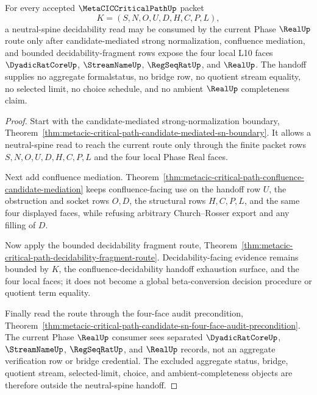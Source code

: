 \begin{theorem}
\label{thm:metacic-critical-path-neutral-spine-decidability-handoff}
For every accepted $\MetaCICCriticalPathUp$ packet
$$
K=(S,N,O,U,D,H,C,P,L),
$$
a neutral-spine decidability read may be consumed by the current Phase $\RealUp$ route only after candidate-mediated strong normalization, confluence mediation, and bounded decidability-fragment rows expose the four local L10 faces $\DyadicRatCoreUp$, $\StreamNameUp$, $\RegSeqRatUp$, and $\RealUp$. The handoff supplies no aggregate formalstatus, no bridge row, no quotient stream equality, no selected limit, no choice schedule, and no ambient $\RealUp$ completeness claim.
\end{theorem}
\begin{proof}
Start with the candidate-mediated strong-normalization boundary, Theorem~\ref{thm:metacic-critical-path-candidate-mediated-sn-boundary}. It allows a neutral-spine read to reach the current route only through the finite packet rows $S,N,O,U,D,H,C,P,L$ and the four local Phase Real faces.

Next add confluence mediation. Theorem~\ref{thm:metacic-critical-path-confluence-candidate-mediation} keeps confluence-facing use on the handoff row $U$, the obstruction and socket rows $O,D$, the structural rows $H,C,P,L$, and the same four displayed faces, while refusing arbitrary Church--Rosser export and any filling of $D$.

Now apply the bounded decidability fragment route, Theorem~\ref{thm:metacic-critical-path-decidability-fragment-route}. Decidability-facing evidence remains bounded by $K$, the confluence-decidability handoff exhaustion surface, and the four local faces; it does not become a global beta-conversion decision procedure or quotient term equality.

Finally read the route through the four-face audit precondition, Theorem~\ref{thm:metacic-critical-path-candidate-sn-four-face-audit-precondition}. The current Phase $\RealUp$ consumer sees separated $\DyadicRatCoreUp$, $\StreamNameUp$, $\RegSeqRatUp$, and $\RealUp$ records, not an aggregate verification row or bridge credential. The excluded aggregate status, bridge, quotient stream, selected-limit, choice, and ambient-completeness objects are therefore outside the neutral-spine handoff.
\end{proof}

